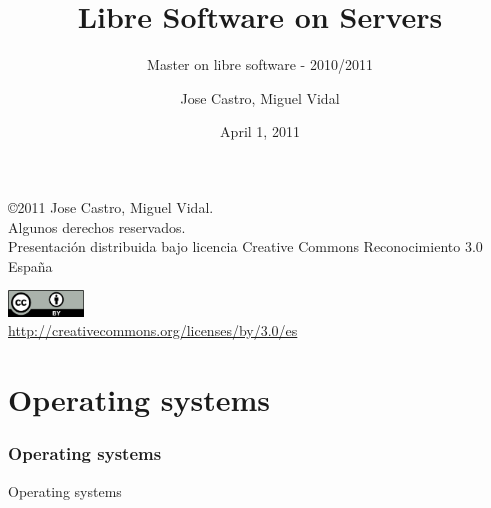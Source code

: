 \documentclass{beamer}
\begin{document}
\title{Libre Software on Servers}
\subtitle{Master on libre software - 2010/2011} 
\author{Jose Castro, Miguel Vidal}
\date{April 1, 2011}


\begin{frame}
  \vspace{3cm}
  \begin{flushright}
    {\footnotesize \copyright{2011} Jose Castro, Miguel Vidal.} \\
    \vspace{0.25cm}
    {\scriptsize Algunos derechos reservados. \\
    Presentación distribuida bajo licencia Creative Commons Reconocimiento 3.0 España}\\
    \vspace{0.25cm}
  \end{flushright}
  \begin{center}
    \href{http://creativecommons.org/licenses/by/3.0/es}{\includegraphics[width=2cm]{figs/cc-by.png}} \\
    {\tiny \url{http://creativecommons.org/licenses/by/3.0/es}}
  \end{center}
\end{frame}


\section{Operating systems}

\begin{frame}
  \frametitle{Operating systems}
  \begin{center}
    \Huge Operating systems
  \end{center}
\end{frame}
\end{document}

